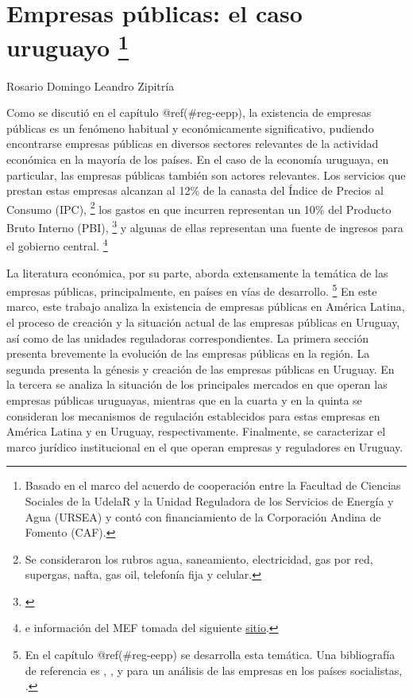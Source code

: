 \documentclass[
  12pt,
  spanish,
]{book}
\begin{document}
\hypertarget{eepp-uy}{%
\chapter[Empresas públicas: el caso uruguayo ]{\texorpdfstring{Empresas públicas: el caso uruguayo \footnote{Basado en el marco del acuerdo de cooperación entre la Facultad de Ciencias Sociales de la UdelaR y la Unidad Reguladora de los Servicios de Energía y Agua (URSEA) y contó con financiamiento de la Corporación Andina de Fomento (CAF).}}{Empresas públicas: el caso uruguayo }}\label{eepp-uy}}

Rosario Domingo
Leandro Zipitría

Como se discutió en el capítulo @ref(\#reg-eepp), la existencia de empresas públicas es un fenómeno habitual y económicamente significativo, pudiendo encontrarse empresas públicas en diversos sectores relevantes de la actividad económica en la mayoría de los países. En el caso de la economía uruguaya, en particular, las empresas públicas también son actores relevantes. Los servicios que prestan estas empresas alcanzan al 12\% de la canasta del Índice de Precios al Consumo (IPC),
\footnote{Se consideraron los rubros agua, saneamiento, electricidad, gas por red, supergas, nafta, gas oil, telefonía fija y celular.}
los gastos en que incurren representan un 10\% del Producto Bruto Interno (PBI),
\footnote{\citet{WorldBank2014}}
y algunas de ellas representan una fuente de ingresos para el gobierno central.
\footnote{\citet{WorldBank1995} e información del MEF tomada del siguiente \href{http://www.mef.gub.uy/indicadores.php}{sitio}.}

La literatura económica, por su parte, aborda extensamente la temática de las empresas públicas, principalmente, en países en vías de desarrollo.
\footnote{En el capítulo @ref(\#reg-eepp) se desarrolla esta temática. Una bibliografía de referencia es \citet{Jones1982}, \citet{WorldBank1995}, y para un análisis de las empresas en los países socialistas, \citet{Roland2000}.}
En este marco, este trabajo analiza la existencia de empresas públicas en América Latina, el proceso de creación y la situación actual de las empresas públicas en Uruguay, así como de las unidades reguladoras correspondientes. La primera sección presenta brevemente la evolución de las empresas públicas en la región. La segunda presenta la génesis y creación de las empresas públicas en Uruguay. En la tercera se analiza la situación de los principales mercados en que operan las empresas públicas uruguayas, mientras que en la cuarta y en la quinta se consideran los mecanismos de regulación establecidos para estas empresas en América Latina y en Uruguay, respectivamente. Finalmente, se caracterizar el marco jurídico institucional en el que operan empresas y reguladores en Uruguay.
\end{document}

